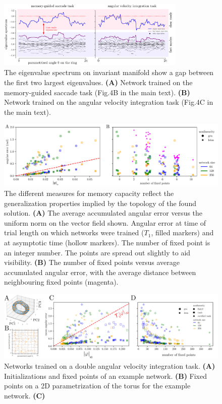 \documentclass[letterpaper]{article}
\begin{document}
\begin{figure}[tbhp]
  \centering
  \includegraphics[width=0.8\textwidth]{eigenvalue_gap}
  \caption{The eigenvalue spectrum on invariant manifold show a gap between the first two largest eigenvalues.
    \textbf{(A)} Network trained on the memory-guided saccade task (Fig.4B in the main text).
    \textbf{(B)} Network trained on the angular velocity integration task (Fig.4C in the main text).
}\label{fig:eigenvalue_gap}
\end{figure}


\begin{figure}[tbhp]
  \centering
  \includegraphics[width=\textwidth]{angular_losses_lstm_gru}
  \caption{The different measures for memory capacity reflect the generalization properties implied by the topology of the found solution.
    \textbf{(A)} The average accumulated angular error versus the uniform norm on the vector field shown.
     Angular error at time of trial length on which networks were trained (\(T_1\), filled markers) and at asymptotic time (hollow markers).
      The number of fixed point is an integer number. The points are spread out slightly to aid visibility.
    \textbf{(B)}  The number of fixed points versus average accumulated angular error, with the average distance between neighbouring fixed points (magenta).
}\label{fig:angular_losses_lstm_gru}
\end{figure}


\begin{figure}[tbhp]
  \centering
  \includegraphics[width=\textwidth]{davit}
  \caption{Networks trained on a double angular velocity integration task.
    \textbf{(A)} Initializations and fixed points of an example network.
    \textbf{(B)} Fixed points on a 2D parametrization of the torus for the example network.
    \textbf{(C)} 
}\label{fig:davit}
\end{figure}
\end{document}
